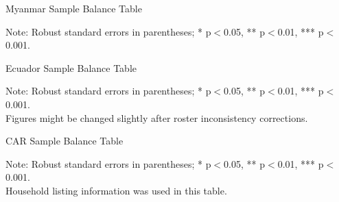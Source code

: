 \documentclass[11pt,harvard]{article}
\begin{document}
\begin{table}[htbp]
	\centering
	\begin{adjustbox}{max width=\textwidth}
		\begin{threeparttable}
			\caption{Myanmar Sample Balance Table}
			\scriptsize
			 
			\label{tab:Myanmar_Modality_Demo_Balance}
			\begin{tablenotes}
				\item Note: Robust standard errors in parentheses; * p$<$0.05, ** p$<$0.01, *** p$<$0.001. 
			\end{tablenotes}
		\end{threeparttable}
	\end{adjustbox}
\end{table}


\begin{table}[htbp]
	\centering
	\begin{adjustbox}{max width=\textwidth}
		\begin{threeparttable}
			\caption{Ecuador Sample Balance Table}
			\scriptsize
			 
			\label{tab:Ecuador_Modality_Demo_Balance}
			\begin{tablenotes}
				\item Note: Robust standard errors in parentheses; * p$<$0.05, ** p$<$0.01, *** p$<$0.001. \\
						 Figures might be changed slightly after roster inconsistency corrections.
			\end{tablenotes}
		\end{threeparttable}
	\end{adjustbox}
\end{table}

\begin{table}[htbp]
	\centering
	\begin{adjustbox}{max width=\textwidth}
		\begin{threeparttable}
			\caption{CAR Sample Balance Table}
			\scriptsize
			 
			\label{tab:CAR_Modality_Own_Phone_Demo_Balance}
			\begin{tablenotes}
				\item Note: Robust standard errors in parentheses; * p$<$0.05, ** p$<$0.01, *** p$<$0.001. \\
						 Household listing information was used in this table.
			\end{tablenotes}
		\end{threeparttable}
	\end{adjustbox}
\end{table}
\end{document}
